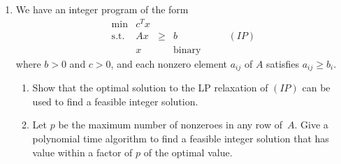 \documentclass[11pt]{article}
\newcommand{\re}{I\!\!R}
\begin{document}
\begin{enumerate}
   \item
   We have an integer program of the form
   \begin{displaymath}
   \begin{array}{lrclr}
   \min & c^Tx \\
   \mbox{s.t.} & Ax & \geq & b & \qquad (IP)  \\
   & x && \mbox{binary}
   \end{array}
   \end{displaymath}
   where $b>0$ and $c>0$, and each nonzero element $a_{ij}$ of $A$ satisfies
   $a_{ij} \geq b_i$.
         \begin{enumerate}
           \item
           Show that the optimal solution to the LP relaxation of $(IP)$
           can be used to find a feasible integer solution.
            \item
           Let $p$ be the maximum number of nonzeroes in any row of~$A$.
           Give a polynomial time algorithm to find a feasible integer
           solution that has value within a factor of $p$ of the optimal value.
         \end{enumerate}




\end{enumerate}
\end{document}
